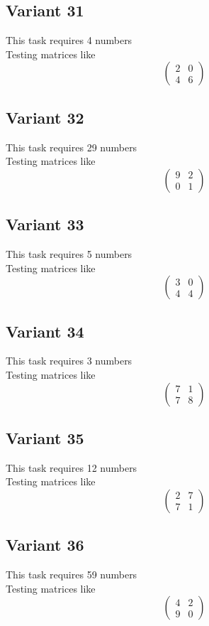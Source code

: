 \documentclass[11pt]{article}
\begin{document}
\subsection*{Variant 31}
This task requires 4 numbers\\
Testing matrices like \[ \begin{pmatrix} 2 & 0\\ 4 & 6 \end{pmatrix} \]

\subsection*{Variant 32}
This task requires 29 numbers\\
Testing matrices like \[ \begin{pmatrix} 9 & 2\\ 0 & 1 \end{pmatrix} \]

\subsection*{Variant 33}
This task requires 5 numbers\\
Testing matrices like \[ \begin{pmatrix} 3 & 0\\ 4 & 4 \end{pmatrix} \]

\subsection*{Variant 34}
This task requires 3 numbers\\
Testing matrices like \[ \begin{pmatrix} 7 & 1\\ 7 & 8 \end{pmatrix} \]

\subsection*{Variant 35}
This task requires 12 numbers\\
Testing matrices like \[ \begin{pmatrix} 2 & 7\\ 7 & 1 \end{pmatrix} \]

\subsection*{Variant 36}
This task requires 59 numbers\\
Testing matrices like \[ \begin{pmatrix} 4 & 2\\ 9 & 0 \end{pmatrix} \]
\end{document}
